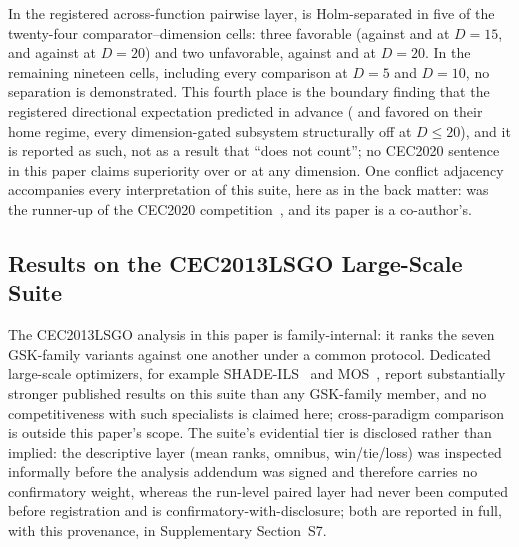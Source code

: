 In the registered across-function pairwise layer, \dtgsk{} is
Holm-separated in five of the twenty-four comparator--dimension cells:
three favorable (against \atmals{} and \egsk{} at $D = 15$, and
against \egsk{} at $D = 20$) and two unfavorable, against \agsk{}
and \fdbagsk{} at $D = 20$. In the remaining nineteen cells, including
every comparison at $D = 5$ and $D = 10$, no separation is demonstrated.
This fourth place is the boundary finding that the registered directional
expectation predicted in advance (\agsk{} and \apgsk{} favored on
their home regime, every dimension-gated \dtgsk{} subsystem structurally
off at $D \leq 20$), and it is reported as such, not as a result that
``does not count''; no CEC2020 sentence in this paper claims superiority
over \agsk{} or \fdbagsk{} at any dimension.
One conflict adjacency accompanies every interpretation of this suite,
here as in the back matter: \agsk{} was the runner-up of the CEC2020
competition~\cite{mohamed2020agsk}, and its paper is a co-author's.

\subsection{Results on the CEC2013LSGO Large-Scale Suite}\label{sec:exp:cec2013lsgo}

The CEC2013LSGO analysis in this paper is family-internal: it ranks the
seven GSK-family variants against one another under a common protocol.
Dedicated large-scale optimizers, for example
SHADE-ILS~\cite{molina2018shadeils} and MOS~\cite{latorre2013mos},
report substantially stronger published results on this suite than any
GSK-family member, and no competitiveness with such specialists is
claimed here; cross-paradigm comparison is outside this paper's scope.
The suite's evidential tier is disclosed rather than implied: the
descriptive layer (mean ranks, omnibus, win/tie/loss) was inspected
informally before the analysis addendum was signed and therefore carries
no confirmatory weight, whereas the run-level paired layer had never
been computed before registration and is confirmatory-with-disclosure;
both are reported in full, with this provenance, in Supplementary
Section~S7.

